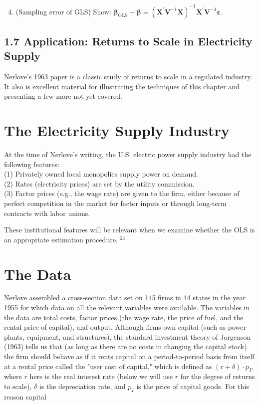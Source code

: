 \documentclass[10pt]{article}
\begin{document}
\begin{enumerate}
  \setcounter{enumi}{3}
  \item (Sampling error of GLS) Show: $\widehat{\boldsymbol{\beta}}_{\mathrm{GLS}}-\boldsymbol{\beta}=\left(\mathbf{X}^{\prime} \mathbf{V}^{-1} \mathbf{X}\right)^{-1} \mathbf{X}^{\prime} \mathbf{V}^{-1} \boldsymbol{\varepsilon}$.
\end{enumerate}

\subsection*{1.7 Application: Returns to Scale in Electricity Supply}
Nerlove's 1963 paper is a classic study of returns to scale in a regulated industry. It also is excellent material for illustrating the techniques of this chapter and presenting a few more not yet covered.

\section*{The Electricity Supply Industry}
At the time of Nerlove's writing, the U.S. electric power supply industry had the following features:\\
(1) Privately owned local monopolies supply power on demand.\\
(2) Rates (electricity prices) are set by the utility commission.\\
(3) Factor prices (e.g., the wage rate) are given to the firm, either because of perfect competition in the market for factor inputs or through long-term contracts with labor unions.

These institutional features will be relevant when we examine whether the OLS is an appropriate estimation procedure. ${ }^{23}$

\section*{The Data}
Nerlove assembled a cross-section data set on 145 firms in 44 states in the year 1955 for which data on all the relevant variables were available. The variables in the data are total costs, factor prices (the wage rate, the price of fuel, and the rental price of capital), and output. Although firms own capital (such as power plants, equipment, and structures), the standard investment theory of Jorgenson (1963) tells us that (as long as there are no costs in changing the capital stock) the firm should behave as if it rents capital on a period-to-period basis from itself at a rental price called the "user cost of capital," which is defined as $(r+\delta) \cdot p_{I}$, where $r$ here is the real interest rate (below we will use $r$ for the degree of returns to scale), $\delta$ is the depreciation rate, and $p_{I}$ is the price of capital goods. For this reason capital
\end{document}
